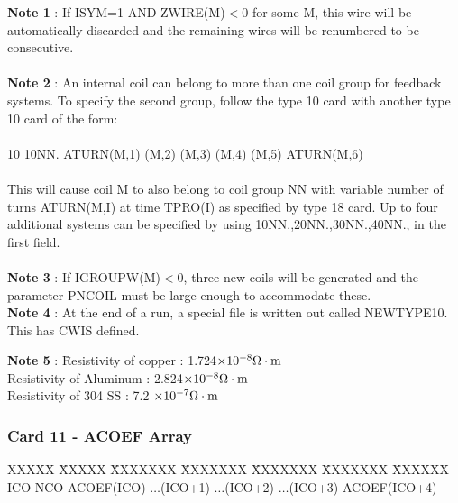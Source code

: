 {\bf Note 1} : If ISYM=1 AND ZWIRE(M)$<$0 for some M, this wire will be
automatically discarded and the remaining wires will be renumbered to be consecutive.\\ 
 \\ 
{\bf Note 2} : An internal coil can belong to more than one coil group for
feedback systems. To specify the second group, follow the type 10 card with another type 10 card
of the form:\\ 
 \\
10    10NN. ATURN(M,1) (M,2) (M,3) (M,4) (M,5) ATURN(M,6) \\
 \\
This will cause coil M to also belong to coil group NN with variable number of turns
ATURN(M,I) at time TPRO(I) as specified by type 18 card.  Up to four additional systems can
be specified by using 10NN.,20NN.,30NN.,40NN., in the first field.\\ 
 \\ 
{\bf Note 3} : If IGROUPW(M)$<$0, three new coils will be generated and the
parameter PNCOIL must be large enough to accommodate these.\\ 
{\bf Note 4} : At the end of a run, a special file is written out called NEWTYPE10.
This has CWIS defined.\\
\begin{tabbing}
{\bf Note 5} : \= Resistivity of copper :  1.724$\times 10^{-8} \Omega \cdot \rm m$\\
               \>Resistivity of Aluminum :  2.824$\times 10^{-8} \Omega \cdot \rm m$\\
               \>Resistivity of 304 SS :  7.2  $\times 10^{-7} \Omega \cdot \rm m$
\end{tabbing}
\newpage \subsubsection{Card 11 - ACOEF Array}
\begin{tabbing} 
XXXXX \= XXXXX \= XXXXXXX \= XXXXXXX \= XXXXXXX \= XXXXXXX \=
XXXXXX        \\ 
\footnotesize ICO \>\footnotesize NCO \>\footnotesize ACOEF(ICO) \>\footnotesize
$\ldots$(ICO+1) \> \footnotesize $\ldots$(ICO+2) \> \footnotesize $\ldots$(ICO+3) \>\footnotesize
ACOEF(ICO+4) 
\end{tabbing} 
